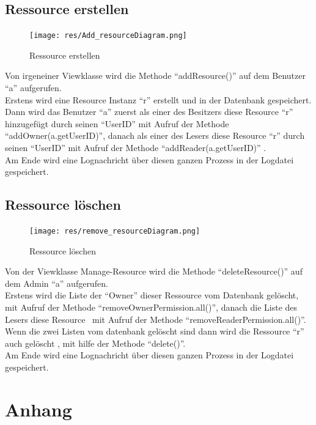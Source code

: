 \documentclass[parskip=full,11pt]{scrartcl}
\begin{document}
  \newpage
 \subsection{Ressource erstellen}
 \begin{figure}[ht!]
 	\centering
 	\texttt{[image: res/Add\_resourceDiagram.png]}
 	\caption{Ressource erstellen}
 \end{figure}
 
Von irgeneiner Viewklasse wird die Methode \enquote{addResource()} auf dem Benutzer \enquote{a}  aufgerufen.\\ Erstens wird eine Resource Instanz \enquote{r} erstellt und in der Datenbank gespeichert.\\ Dann wird das Benutzer \enquote{a} zuerst als einer des Besitzers diese Resource \enquote{r} hinzugefügt durch seinen \enquote{UserID} mit Aufruf der Methode \enquote{addOwner(a.getUserID)}, danach als einer des Lesers diese Resource \enquote{r} durch seinen \enquote{UserID} mit Aufruf der Methode \enquote{addReader(a.getUserID)} .\\Am Ende wird eine Lognachricht über diesen ganzen Prozess  in der Logdatei gespeichert.

 
 
  \newpage
 \subsection{Ressource löschen}
 \begin{figure}[ht!]
 	\centering
 	\texttt{[image: res/remove\_resourceDiagram.png]}
 	\caption{Ressource löschen}
 \end{figure}
 
 
 Von der Viewklasse Manage-Resource wird die Methode \enquote{deleteResource()} auf dem Admin \enquote{a}  aufgerufen.\\ Erstens wird die Liste der \enquote{Owner} dieser Ressource vom Datenbank gelöscht, mit Aufruf der Methode \enquote{removeOwnerPermission.all()}, danach die Liste des Lesers diese Resource \ mit Aufruf der Methode \enquote{removeReaderPermission.all()}.\\
 Wenn die zwei Listen vom datenbank gelöscht sind dann wird die Ressource \enquote{r} auch gelöscht , mit hilfe der Methode \enquote{delete()}.\\ Am Ende wird eine Lognachricht über diesen ganzen Prozess  in der Logdatei gespeichert.\\
 
 \newpage
 \section{Anhang}
 \newpage
{}
\printglossary	
	
 
\end{document}
